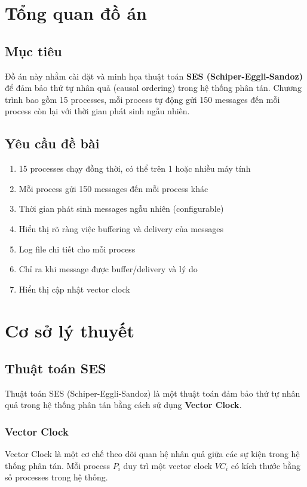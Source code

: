 \section{Tổng quan đồ án}

\subsection{Mục tiêu}
Đồ án này nhằm cài đặt và minh họa thuật toán \textbf{SES (Schiper-Eggli-Sandoz)} để đảm bảo thứ tự nhân quả (causal ordering) trong hệ thống phân tán. Chương trình bao gồm 15 processes, mỗi process tự động gửi 150 messages đến mỗi process còn lại với thời gian phát sinh ngẫu nhiên.

\subsection{Yêu cầu đề bài}
\begin{enumerate}
    \item 15 processes chạy đồng thời, có thể trên 1 hoặc nhiều máy tính
    \item Mỗi process gửi 150 messages đến mỗi process khác
    \item Thời gian phát sinh messages ngẫu nhiên (configurable)
    \item Hiển thị rõ ràng việc buffering và delivery của messages
    \item Log file chi tiết cho mỗi process
    \item Chỉ ra khi message được buffer/delivery và lý do
    \item Hiển thị cập nhật vector clock
\end{enumerate}

\section{Cơ sở lý thuyết}

\subsection{Thuật toán SES}

Thuật toán SES (Schiper-Eggli-Sandoz) là một thuật toán đảm bảo thứ tự nhân quả trong hệ thống phân tán bằng cách sử dụng \textbf{Vector Clock}.

\subsubsection{Vector Clock}
Vector Clock là một cơ chế theo dõi quan hệ nhân quả giữa các sự kiện trong hệ thống phân tán. Mỗi process $P_i$ duy trì một vector clock $VC_i$ có kích thước bằng số processes trong hệ thống.

